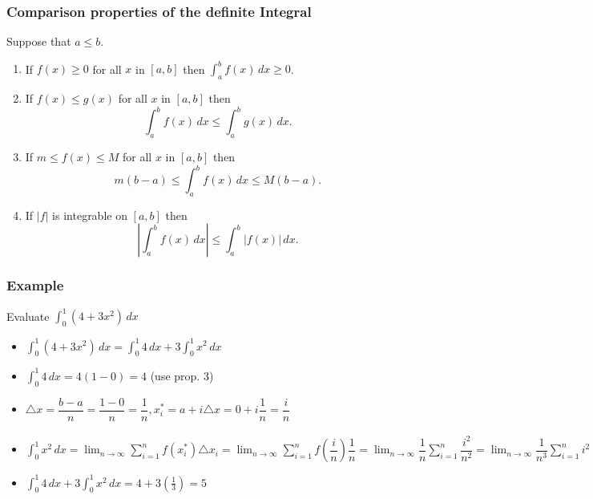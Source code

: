 \documentclass[t]{beamer}
\theoremstyle{plain}
\theoremstyle{definition}
\newcommand{\ds}{\displaystyle}
\begin{document}
\begin{frame}
\frametitle{Comparison properties of the definite Integral}
\footnotesize

\noindent Suppose that $a \leq b$.

\begin{enumerate}
\item If $f(x)\geq0$ for all $x$ in $[a,b]$ then $\ds \int_a^b f(x)\,dx\geq0$.

\vspace*{.3cm}

\item If $f(x)\leq g(x)$ for all $x$ in $[a,b]$ then
\[\ds \int_a^b f(x)\,dx\leq\int_a^b g(x)\,dx.\]

\vspace*{.3cm}

\item If $m\leq f(x)\leq M$ for all $x$ in $[a,b]$ then
\[m(b-a)\leq \int_a^b f(x)\,dx \leq M(b-a).\]


\vspace*{.3cm}

\item If $|f|$ is integrable on $[a,b]$ then
\[\left|\int_a^bf(x)\,dx\right|\leq\int_a^b|f(x)|\,dx.\]
\end{enumerate}
\end{frame}

\begin{frame}
\frametitle{Example}
\footnotesize
Evaluate $\ds\int_0^1 (4 + 3x^2) \, dx$ \pause

\begin{itemize}
	\item $\ds\int_0^1 (4 + 3x^2) \, dx = \ds\int_0^1 4 \, dx +  3 \ds\int_0^1 x^2 \, dx$
	\item $\ds\int_0^1 4 \, dx = 4(1-0) = 4$ (use prop. 3)
	\item $\triangle x = \dfrac{b-a}{n} = \dfrac{1 - 0}{n} = \dfrac{1}{n}, x_i^{*} = a + i\triangle{x} = 0 + i\dfrac{1}{n} = \dfrac{i}{n}$
	\item $\ds\int_0^1 x^2 \, dx =  \lim_{n\rightarrow \infty} \sum_{i=1}^{n} f(x_{i}^{*})\triangle x_{i} = \lim_{n\rightarrow \infty} \sum_{i=1}^{n} f(\dfrac{i}{n})\dfrac{1}{n} = \lim_{n\rightarrow \infty} \dfrac{1}{n} \sum_{i=1}^{n} \dfrac{i^2}{n^2} =  \lim_{n\rightarrow \infty}  \dfrac{1}{n^3} \sum_{i=1}^{n} i^2 =   \lim_{n\rightarrow \infty} \dfrac{1}{n^3} \big( \dfrac{n(n+1)(2n+1)}{6}\big) =  \lim_{n\rightarrow \infty}\dfrac{2n^3 + 3n^2 + n}{6n^3} =  \lim_{n\rightarrow \infty} \dfrac{n^3 (2 + \frac{3}{n} + \frac{1}{n^2})}{6n^3} = \frac{1}{3}$
	\item $ \ds\int_0^1 4 \, dx +  3 \ds\int_0^1 x^2 \, dx = 4 + 3(\frac{1}{3}) = 5$
\end{itemize}

\end{frame}
\end{document}

